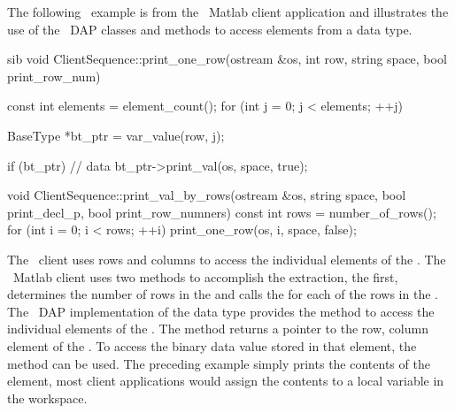 \documentclass{dods-paper}
\begin{document}
The following \Cpp\ example is from the \Cpp\ Matlab client
application and illustrates the use of the \Cpp\ DAP classes
and methods to access elements from a  data type.

\begin{vcode}{sib}
void 
ClientSequence::print_one_row(ostream &os, int row, string space,
                              bool print_row_num)
{

    const int elements = element_count();
    for (int j = 0; j < elements; ++j) {
        BaseType *bt_ptr = var_value(row, j);

        if (bt_ptr) {           // data
            bt_ptr->print_val(os, space, true);
        }
    }

}

void 
ClientSequence::print_val_by_rows(ostream &os, string space,
                                  bool print_decl_p,
                                  bool print_row_numners)
{
    const int rows = number_of_rows();
    for (int i = 0; i < rows; ++i) {
        print_one_row(os, i, space, false);
    }
}
\end{vcode}

The \Cpp\ client uses rows and columns to access the individual elements of the
. The \Cpp\ Matlab client uses two methods to accomplish the
extraction, the first,  determines the number of
rows in the  and calls the  for each
of the rows in the . The \Cpp\ DAP implementation of the
 data type provides the  method to
access the individual elements of the . The
 method returns a  pointer to the row,
column element of the . To access the binary data value
stored in that element, the  method  can be
used. The preceding example simply prints the contents of the element, most
client applications would assign the contents to a local variable in the
workspace.

        
\end{document}
